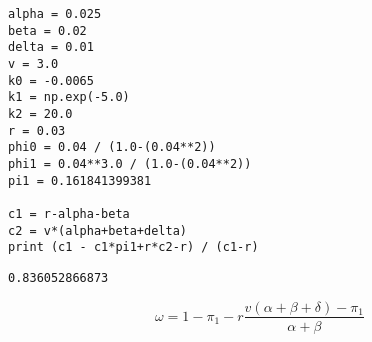 \documentclass[12pt,fleqn]{article}\usepackage{../../common}
\begin{document}
\begin{verbatim}
alpha = 0.025
beta = 0.02
delta = 0.01
v = 3.0
k0 = -0.0065
k1 = np.exp(-5.0)
k2 = 20.0
r = 0.03
phi0 = 0.04 / (1.0-(0.04**2))
phi1 = 0.04**3.0 / (1.0-(0.04**2))
pi1 = 0.161841399381

c1 = r-alpha-beta
c2 = v*(alpha+beta+delta)
print (c1 - c1*pi1+r*c2-r) / (c1-r)
\end{verbatim}

\begin{verbatim}
0.836052866873
\end{verbatim}



$$ \omega = 1-\pi_1-r \frac{v(\alpha+\beta+\delta) - \pi_1}{\alpha+\beta}$$
\end{document}
